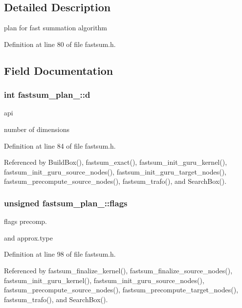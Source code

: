 \subsection{Detailed Description}
plan for fast summation algorithm 

Definition at line 80 of file fastsum.\-h.



\subsection{Field Documentation}
\hypertarget{structfastsum__plan___ad70ee163a195c108d0a5510a8407a307}{
\subsubsection[{d}]{\setlength{\rightskip}{0pt plus 5cm}int fastsum\-\_\-plan\-\_\-\-::d}}\label{structfastsum__plan___ad70ee163a195c108d0a5510a8407a307}


api 

number of dimensions 

Definition at line 84 of file fastsum.\-h.



Referenced by Build\-Box(), fastsum\-\_\-exact(), fastsum\-\_\-init\-\_\-guru\-\_\-kernel(), fastsum\-\_\-init\-\_\-guru\-\_\-source\-\_\-nodes(), fastsum\-\_\-init\-\_\-guru\-\_\-target\-\_\-nodes(), fastsum\-\_\-precompute\-\_\-source\-\_\-nodes(), fastsum\-\_\-trafo(), and Search\-Box().

\hypertarget{structfastsum__plan___ab8680533cc667f052c9c83275e0756fa}{
\subsubsection[{flags}]{\setlength{\rightskip}{0pt plus 5cm}unsigned fastsum\-\_\-plan\-\_\-\-::flags}}\label{structfastsum__plan___ab8680533cc667f052c9c83275e0756fa}


flags precomp. 

and approx.\-type 

Definition at line 98 of file fastsum.\-h.



Referenced by fastsum\-\_\-finalize\-\_\-kernel(), fastsum\-\_\-finalize\-\_\-source\-\_\-nodes(), fastsum\-\_\-init\-\_\-guru\-\_\-kernel(), fastsum\-\_\-init\-\_\-guru\-\_\-source\-\_\-nodes(), fastsum\-\_\-precompute\-\_\-source\-\_\-nodes(), fastsum\-\_\-precompute\-\_\-target\-\_\-nodes(), fastsum\-\_\-trafo(), and Search\-Box().

